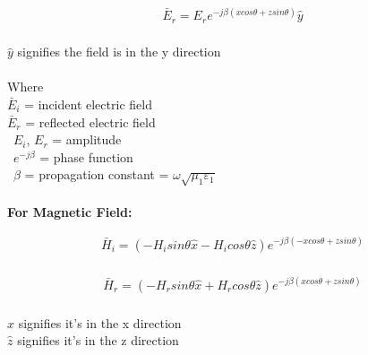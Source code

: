 \\ \begin{align}
\bar{E}_r =E_r  e^{-j\beta ( xcos\theta + zsin\theta)} \hat{y}
\end{align}  
\\ $\hat{y}$ signifies the field is in the y direction
\\\\ Where
\\ $\bar{E}_i$ = incident electric field
\\ $\bar{E}_r$ = reflected electric field
\\\ $E_i$, $E_r$ = amplitude
\\\ $e^{-j\beta}$ = phase function
\\\ $\beta$ = propagation constant = $\omega \sqrt{\mu_1\varepsilon_1}$ \\\\


\textbf{For Magnetic Field:}
 
\begin{align}
\bar{H}_i = (-H_i sin\theta \hat{x} - H_i cos\theta \hat{z}) e ^{-j\beta( -xcos\theta + zsin\theta)}
\end{align}
\\ \begin{align}
\bar{H}_r = (-H_r sin\theta \hat{x} + H_r cos\theta \hat{z}) e ^{-j\beta( xcos\theta + zsin\theta)}
\end{align}
\\ $\hat{x}$ signifies it's in the x direction  
\\ $\hat{z}$ signifies it's in the z direction\\\\

